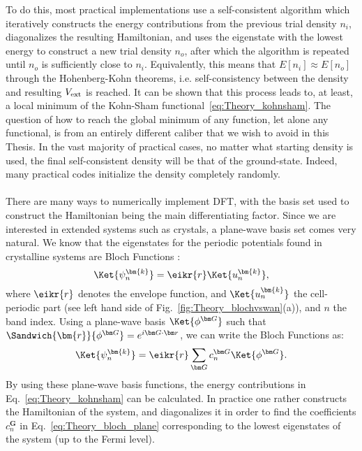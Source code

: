 To do this, most practical implementations use a self-consistent algorithm which iteratively constructs the energy contributions from the previous trial density $n_i$, diagonalizes the resulting Hamiltonian, and uses the eigenstate with the lowest energy to construct a new trial density $n_o$, after which the algorithm is repeated until $n_o$ is sufficiently close to $n_i$. Equivalently, this means that $E[n_i] \approx E[n_o]$ through the Hohenberg-Kohn theorems, i.e. self-consistency between the density and resulting $V_{\rm ext}$ is reached.
It can be shown that this process leads to, at least, a local minimum of the Kohn-Sham functional~\eqref{eq:Theory_kohnsham}.
The question of how to reach the global minimum of any function, let alone any functional, is from an entirely different caliber that we wish to avoid in this Thesis.
In the vast majority of practical cases, no matter what starting density is used, the final self-consistent density will be that of the ground-state. Indeed, many practical codes initialize the density completely randomly. 
\\\\
There are many ways to numerically implement DFT, with the basis set used to construct the Hamiltonian being the main differentiating factor.
Since we are interested in extended systems such as crystals, a plane-wave basis set comes very natural.
We know that the eigenstates for the periodic potentials found in crystalline systems are Bloch Functions \cite{Ashcroft}:
\begin{equation}
	\Ket{\psi^{\bm{k}}_n} = \eikr{r} \Ket{u^{\bm{k}}_n},
\end{equation}
where $\eikr{r}$ denotes the envelope function, and $\Ket{u^{\bm{k}}_n}$ the cell-periodic part (see left hand side of Fig.~\ref{fig:Theory_blochvswan}(a)), and $n$ the band index.
Using a plane-wave basis $\Ket{\phi^{\bm G}}$ such that $\Sandwich{\bm{r}}{\phi^{\bm G}} = e^{i\bm G \cdot \bm r}$, we can write the Bloch Functions as:
\begin{equation}
	\label{eq:Theory_bloch_plane}
\Ket{\psi_n^{\bm{k}}} = \eikr{r} \sum_{\bm G} c_n^{\bm G} \Ket{\phi^{\bm G}}.
\end{equation}
By using these plane-wave basis functions, the energy contributions in Eq.~\eqref{eq:Theory_kohnsham} can be calculated.
In practice one rather constructs the Hamiltonian of the system, and diagonalizes it in order to find the coefficients $c_n^{\bm G}$ in Eq.~\eqref{eq:Theory_bloch_plane} corresponding to the lowest eigenstates of the system (up to the Fermi level).
